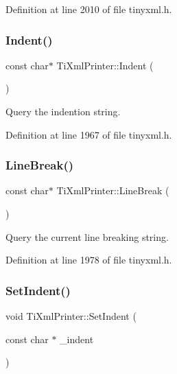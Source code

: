 Definition at line 2010 of file tinyxml.\+h.

\hypertarget{class_ti_xml_printer_abb33ec7d4bad6aaeb57f4304394b133d}{}\label{class_ti_xml_printer_abb33ec7d4bad6aaeb57f4304394b133d} 
\subsubsection{\texorpdfstring{Indent()}{Indent()}}
{\footnotesize\ttfamily const char$\ast$ Ti\+Xml\+Printer\+::\+Indent (\begin{DoxyParamCaption}{ }\end{DoxyParamCaption})\hspace{0.3cm}{\ttfamily [inline]}}



Query the indention string. 



Definition at line 1967 of file tinyxml.\+h.

\hypertarget{class_ti_xml_printer_a11f1b4804a460b175ec244eb5724d96d}{}\label{class_ti_xml_printer_a11f1b4804a460b175ec244eb5724d96d} 
\subsubsection{\texorpdfstring{Line\+Break()}{LineBreak()}}
{\footnotesize\ttfamily const char$\ast$ Ti\+Xml\+Printer\+::\+Line\+Break (\begin{DoxyParamCaption}{ }\end{DoxyParamCaption})\hspace{0.3cm}{\ttfamily [inline]}}



Query the current line breaking string. 



Definition at line 1978 of file tinyxml.\+h.

\hypertarget{class_ti_xml_printer_a213377a4070c7e625bae59716b089e5e}{}\label{class_ti_xml_printer_a213377a4070c7e625bae59716b089e5e} 
\subsubsection{\texorpdfstring{Set\+Indent()}{SetIndent()}}
{\footnotesize\ttfamily void Ti\+Xml\+Printer\+::\+Set\+Indent (\begin{DoxyParamCaption}\item[{const char $\ast$}]{\+\_\+indent }\end{DoxyParamCaption})\hspace{0.3cm}{\ttfamily [inline]}}

